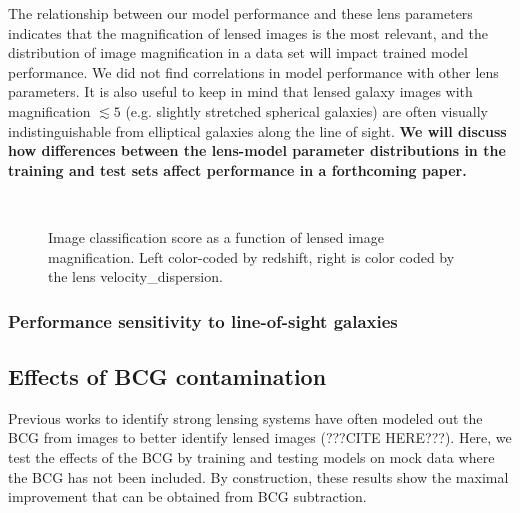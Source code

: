 \documentclass{emulateapj}
\newcommand{\todo}[1]{{\bf\color{blue} #1}}
\def\lsim{\lesssim}
\begin{document}
The relationship between our model performance and these lens
parameters indicates that the magnification of lensed images is the
most relevant, and the distribution of image magnification in a data
set will impact trained model performance.  We did not find
correlations in model performance with other lens parameters.  It is
also useful to keep in mind that lensed galaxy images with
magnification $\lsim5$ (e.g. slightly stretched spherical galaxies)
are often visually indistinguishable from elliptical galaxies along
the line of sight.  \todo{We will discuss how differences between the
  lens-model parameter distributions in the training and test sets
  affect performance in a forthcoming paper.}

\begin{figure*}[t]
  \centering 

\mbox{
    \hfill
} 
\caption{Image classification score as a function of lensed image
  magnification.  Left color-coded by redshift, right is color coded
  by the lens velocity_dispersion.}
\label{fig:scorevslensparams}
\end{figure*}

\subsubsection{Performance sensitivity to line-of-sight galaxies}
\label{sec:peformance_lensmodel}



\subsection{Effects of BCG contamination}

Previous works to identify strong lensing systems have often modeled
out the BCG from images to better identify lensed images (???CITE
HERE???).  Here, we test the effects of the BCG by training and
testing models on mock data where the BCG has not been included.  By
construction, these results show the maximal improvement that can be
obtained from BCG subtraction.
\end{document}
